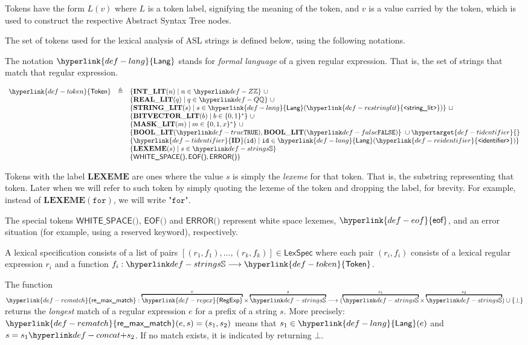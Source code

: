 \documentclass{book}
\newcommand\terminal[1]{\mathtt{\mathbf{#1}}}
\newcommand\verbatimterminal[2]{\texttt{"}\texttt{#2}\texttt{"}}
\newcommand\Tfor[0]{\verbatimterminal{FOR}{for}}
\newcommand\Tidentifier[0]{\hyperlink{def-tidentifier}{\terminal{ID}}}
\newcommand\Tstringlit[0]{\terminal{STRING\_LIT}}
\newcommand\Tmasklit[0]{\terminal{MASK\_LIT}}
\newcommand\Tbitvectorlit[0]{\terminal{BITVECTOR\_LIT}}
\newcommand\Tintlit[0]{\terminal{INT\_LIT}}
\newcommand\Treallit[0]{\terminal{REAL\_LIT}}
\newcommand\Tboollit[0]{\terminal{BOOL\_LIT}}
\newcommand\Tlexeme[0]{\terminal{LEXEME}}
\newcommand\eof[0]{\hyperlink{def-eof}{\textsf{eof}}}
\newcommand\REstringlit[0]{\hyperlink{def-restringlit}{\texttt{<}\textsf{string\_lit}\texttt{>}}}
\newcommand\REidentifier[0]{\hyperlink{def-reidentifier}{\texttt{<}\textsf{identifier}\texttt{>}}}
\newcommand\remaxmatch[0]{\hyperlink{def-rematch}{\textsf{re\_max\_match}}}
\newcommand\Token[0]{\hyperlink{def-token}{\textsf{Token}}}
\newcommand\Teof[0]{\textsf{EOF()}}
\newcommand\Terror[0]{\textsf{ERROR()}}
\newcommand\Twhitespace[0]{\textsf{WHITE\_SPACE()}}
\newcommand\LexSpec[0]{\textsf{LexSpec}}
\newcommand\Lang[0]{\hyperlink{def-lang}{\textsf{Lang}}}
\newcommand\RegExp[0]{\hyperlink{def-regex}{\textsf{RegExp}}}
\begin{document}
Tokens have the form $L(v)$ where $L$ is a token label, signifying the meaning of the token,
and $v$ is a value carried by the token, which is used to construct the respective Abstract Syntax Tree nodes.

The set of tokens used for the lexical analysis of ASL strings is defined below, using the following notations.

\hypertarget{def-lang}{}
The notation $\Lang$ stands for \emph{formal language} of a given regular expression. That is, the set of strings that match
that regular expression.

\hypertarget{def-token}{}
\[
\begin{array}{rcl}
\Token &\triangleq& \{\Tintlit(n) \;|\; n\in\Z\}\ \cup\\
        & & \{\Treallit(q) \;|\; q\in\Q\}\ \cup\\
        & & \{\Tstringlit(s) \;|\; s\in \Lang(\REstringlit)\}\ \cup\\
        & & \{\Tbitvectorlit(b) \;|\; b\in\{0,1\}^*\}\ \cup\\
        & & \{\Tmasklit(m) \;|\; m\in\{0,1,x\}^*\}\ \cup\\
        & & \{\Tboollit(\True), \Tboollit(\False)\}\ \cup \hypertarget{def-tidentifier}{}\\
        & & \{\Tidentifier(\id) \;|\; \id\in \Lang(\REidentifier)\} \\
        & & \{\Tlexeme(s) \;|\; s\in\Strings\} \\
        & & \{\Twhitespace, \Teof, \Terror\}
\end{array}
\]

Tokens with the label $\Tlexeme$ are ones where the value $s$ is simply the \emph{lexeme} for that token.
That is, the substring representing that token. Later when we will refer to such token by simply quoting
the lexeme of the token and dropping the label, for brevity. For example, instead of $\Tlexeme(\texttt{for})$,
we will write $\Tfor$.

The special tokens $\Twhitespace$, $\Teof$ and $\Terror$ represent white space lexemes, $\eof$, and an error situation
(for example, using a reserved keyword), respectively.

A lexical specification consists of a list of pairs $[(r_1,f_1),\ldots,(r_k,f_k)] \in \LexSpec$
where each pair $(r_i,f_i)$ consists of a lexical regular expression $r_i$
and a function $f_i : \Strings \aslto \Token$.

The function $\remaxmatch : \overname{\RegExp}{e} \times \overname{\Strings}{s} \aslto (\overname{\Strings}{s_1} \times \overname{\Strings}{s_2}) \cup \{\bot\}$
returns the \emph{longest} match of a regular expression $e$ for a prefix of a string $s$.
More precisely:
$\remaxmatch(e, s) = (s_1,s_2)$ means that $s_1\in\Lang(e)$ and $s = s_1 \concat s_2$.
If no match exists, it is indicated by returning $\bot$.
\end{document}
